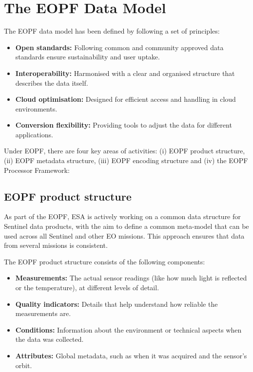 \documentclass[
  letterpaper,
  DIV=11,
  numbers=noendperiod]{scrreprt}
\providecommand{\tightlist}{%
  \setlength{\itemsep}{0pt}\setlength{\parskip}{0pt}}
\begin{document}
\section{The EOPF Data Model}\label{the-eopf-data-model}

The EOPF data model has been defined by following a set of principles:

\begin{itemize}
\tightlist
\item
  \textbf{Open standards:} Following common and community approved data
  standards ensure sustainability and user uptake.
\item
  \textbf{Interoperability:} Harmonised with a clear and organised
  structure that describes the data itself.
\item
  \textbf{Cloud optimisation:} Designed for efficient access and
  handling in cloud environments.
\item
  \textbf{Conversion flexibility:} Providing tools to adjust the data
  for different applications.
\end{itemize}

Under EOPF, there are four key areas of activities: (i) EOPF product
structure, (ii) EOPF metadata structure, (iii) EOPF encoding structure
and (iv) the EOPF Processor Framework:

\subsection{EOPF product structure}\label{eopf-product-structure}

As part of the EOPF, ESA is actively working on a common data structure
for Sentinel data products, with the aim to define a common meta-model
that can be used across all Sentinel and other EO missions. This
approach ensures that data from several missions is consistent.

The EOPF product structure consists of the following components:

\begin{itemize}
\tightlist
\item
  \textbf{Measurements:} The actual sensor readings (like how much light
  is reflected or the temperature), at different levels of detail.
\item
  \textbf{Quality indicators:} Details that help understand how reliable
  the measurements are.
\item
  \textbf{Conditions:} Information about the environment or technical
  aspects when the data was collected.
\item
  \textbf{Attributes:} Global metadata, such as when it was acquired and
  the sensor's orbit.
\end{itemize}
\end{document}

